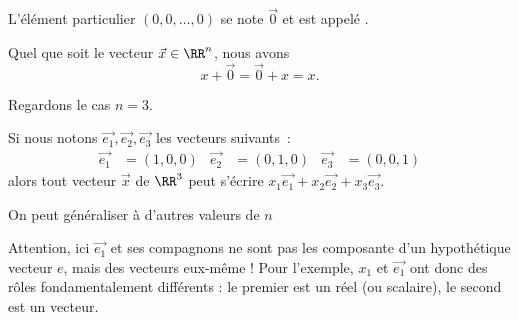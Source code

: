 \begin{frame}
  \begin{definition}
    L'élément particulier \((0, 0, \ldots, 0)\) se note \(\vec 0\) et est appelé .
  \end{definition}

  \begin{proposition}Quel que soit le vecteur \(\vec x\in \RR^{n}\), nous avons
    \begin{equation*}
      x + \vec 0 = \vec 0 + x = x.
    \end{equation*}
  \end{proposition}
\end{frame}

\begin{frame}
  Regardons le cas \(n = 3\).\pause

  Si nous notons \(\vec {e_{1}}, \vec {e_{2}}, \vec {e_{3}}\) les vecteurs suivants~:
  \begin{align*}
    \vec {e_{1}} &= (1, 0, 0) & \vec {e_{2}} &= (0, 1, 0) & \vec {e_{3}} &= (0, 0, 1)
  \end{align*}\pause
  alors tout vecteur \(\vec x\) de \(\RR^{3}\) peut s'écrire \(x_{1}\vec {e_{1}} + x_{2} \vec {e_{2}} + x_{3} \vec {e_{3}}\).

\pause  On peut généraliser à d'autres valeurs de \(n\)
\pause
\begin{remark*}
  Attention, ici \(\vec {e_{1}}\) et ses compagnons ne sont pas les composante d'un hypothétique vecteur \(e\), mais des vecteurs eux-même ! Pour l'exemple, \(x_{1}\) et \(\vec {e_{1}}\) ont donc des rôles fondamentalement différents : le premier est un réel (ou \og scalaire\fg{}), le second est un vecteur.
\end{remark*}
\end{frame}


